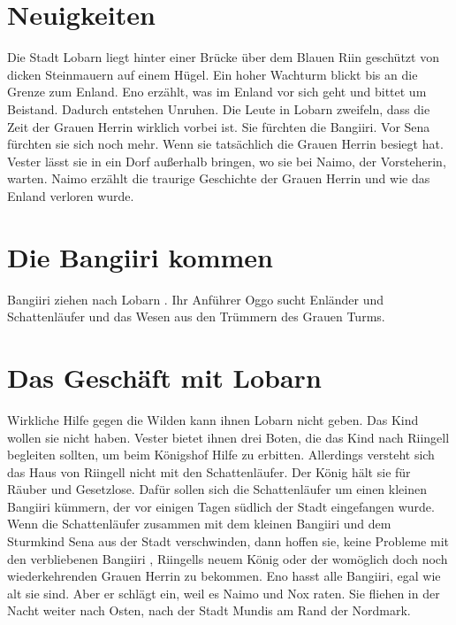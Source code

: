 \documentclass[12pt,a4paper,onecolumn,twoside,ngerman]{book}
\newcommand{\Sena}{Sena}
\newcommand{\Sturmkind}{Sturmkind}
\newcommand{\Bangiri}{Bangiiri}
\newcommand{\Oggo}{Oggo}
\newcommand{\Enland}{Enland}
\newcommand{\Enlaender}{Enländer}
\newcommand{\Schattenlaufer}{Schattenläufer}
\newcommand{\Eno}{Eno}
\newcommand{\Nox}{Nox}
\newcommand{\Lobarn}{Lobarn}
\newcommand{\Vester}{Vester}
\newcommand{\Naimo}{Naimo}
\newcommand{\Nordmark}{Nordmark}
\newcommand{\Rhingell}{Riingell}
\newcommand{\Mundis}{Mundis}
\newcommand{\Rhin}{Riin}
\begin{document}
\section{Neuigkeiten}
Die Stadt {\Lobarn} liegt hinter einer Brücke über dem Blauen {\Rhin} geschützt von dicken Steinmauern auf einem Hügel. Ein hoher Wachturm blickt bis an die Grenze zum {\Enland}.\linebreak
{\Eno} erzählt, was im {\Enland} vor sich geht und bittet um Beistand. Dadurch entstehen Unruhen. Die Leute in {\Lobarn} zweifeln, dass die Zeit der Grauen Herrin wirklich vorbei ist. Sie fürchten die {\Bangiri}. Vor {\Sena} fürchten sie sich noch mehr. Wenn sie tatsächlich die Grauen Herrin besiegt hat.\linebreak
{\Vester} lässt sie in ein Dorf außerhalb bringen, wo sie bei {\Naimo}, der Vorsteherin, warten.\linebreak
{\Naimo} erzählt die traurige Geschichte der Grauen Herrin und wie das {\Enland} verloren wurde.

\section{Die {\Bangiri}  kommen}
{\Bangiri} ziehen nach {\Lobarn} . Ihr Anführer {\Oggo} sucht {\Enlaender} und {\Schattenlaufer} und das Wesen aus den Trümmern des Grauen Turms. 

\section{Das Geschäft mit \Lobarn}
Wirkliche Hilfe gegen die Wilden kann ihnen {\Lobarn} nicht geben. Das Kind wollen sie nicht haben.\linebreak
{\Vester} bietet ihnen drei Boten, die das Kind nach {\Rhingell} begleiten sollten, um beim Königshof Hilfe zu erbitten. Allerdings versteht sich das Haus von {\Rhingell} nicht mit den {\Schattenlaufer}. Der König hält sie für Räuber und Gesetzlose. Dafür sollen sich die {\Schattenlaufer} um einen kleinen {\Bangiri} kümmern, der vor einigen Tagen südlich der Stadt eingefangen wurde.\linebreak
Wenn die {\Schattenlaufer} zusammen mit dem kleinen {\Bangiri} und dem {\Sturmkind} {\Sena} aus der Stadt verschwinden, dann hoffen sie, keine Probleme mit den verbliebenen {\Bangiri} , {\Rhingell}s neuem König oder der womöglich doch noch wiederkehrenden Grauen Herrin zu bekommen.\linebreak
{\Eno} hasst alle {\Bangiri}, egal wie alt sie sind. Aber er schlägt ein, weil es {\Naimo} und {\Nox} raten. Sie fliehen in der Nacht weiter nach Osten, nach der Stadt {\Mundis} am Rand der {\Nordmark}.
\end{document}
